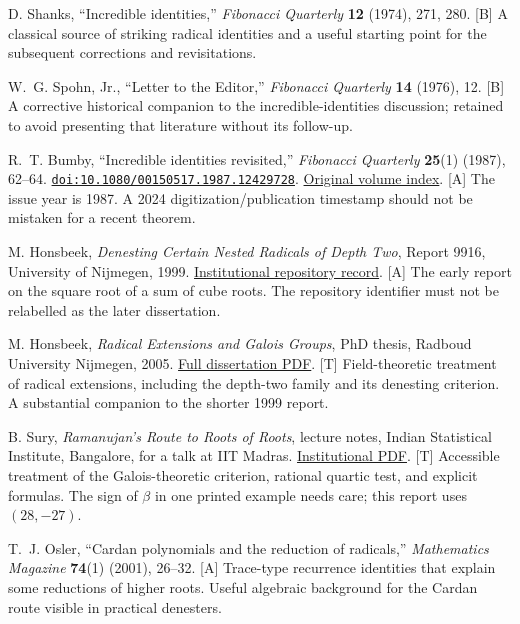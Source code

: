 \documentclass[11pt,a4paper]{article}
\numberwithin{equation}{section}
\theoremstyle{definition}\newtheorem{definition}[theorem]{Definition}
\theoremstyle{remark}\newtheorem{remark}[theorem]{Remark}
\newcommand{\doi}[1]{\href{https://doi.org/#1}{\nolinkurl{doi:#1}}}
\newcommand{\access}[2]{\href{#1}{#2}}
\newcommand{\status}[1]{\textsf{\footnotesize[#1]}}
\begin{document}
\begin{thebibliography}{99}
 D. Shanks, ``Incredible identities,'' \emph{Fibonacci Quarterly} \textbf{12} (1974), 271, 280. \status{B}
A classical source of striking radical identities and a useful starting point for the subsequent corrections and revisitations.

 W.~G. Spohn, Jr., ``Letter to the Editor,'' \emph{Fibonacci Quarterly} \textbf{14} (1976), 12. \status{B}
A corrective historical companion to the incredible-identities discussion; retained to avoid presenting that literature without its follow-up.

 R.~T. Bumby, ``Incredible identities revisited,'' \emph{Fibonacci Quarterly} \textbf{25}(1) (1987), 62--64. \doi{10.1080/00150517.1987.12429728}.
\access{https://www.fq.math.ca/25-1.html}{Original volume index}. \status{A}
The issue year is 1987. A 2024 digitization/publication timestamp should not be mistaken for a recent theorem.

 M. Honsbeek, \emph{Denesting Certain Nested Radicals of Depth Two}, Report 9916, University of Nijmegen, 1999.
\access{https://repository.ubn.ru.nl/handle/2066/18722}{Institutional repository record}. \status{A}
The early report on the square root of a sum of cube roots. The repository identifier must not be relabelled as the later dissertation.

 M. Honsbeek, \emph{Radical Extensions and Galois Groups}, PhD thesis, Radboud University Nijmegen, 2005.
\access{https://www.math.ru.nl/~bosma/students/honsbeek/M_Honsbeek_thesis.pdf}{Full dissertation PDF}. \status{T}
Field-theoretic treatment of radical extensions, including the depth-two family and its denesting criterion. A substantial companion to the shorter 1999 report.

 B. Sury, \emph{Ramanujan's Route to Roots of Roots}, lecture notes, Indian Statistical Institute, Bangalore, for a talk at IIT Madras.
\access{https://www.isibang.ac.in/~sury/ramanujanday.pdf}{Institutional PDF}. \status{T}
Accessible treatment of the Galois-theoretic criterion, rational quartic test, and explicit formulas. The sign of $\beta$ in one printed example needs care; this report uses $(28,-27)$.

 T.~J. Osler, ``Cardan polynomials and the reduction of radicals,'' \emph{Mathematics Magazine} \textbf{74}(1) (2001), 26--32. \status{A}
Trace-type recurrence identities that explain some reductions of higher roots. Useful algebraic background for the Cardan route visible in practical denesters.


\end{thebibliography}
\end{document}
